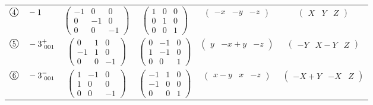 \documentclass[fleqn,10pt,landscape]{jsarticle}
\begin{document}
\begin{center}
\begin{longtable}{lcccc}
$ {\ooalign{\hfil\resizebox{.8\width}{\height}{4}\hfil\crcr\raise.1ex\hbox{\large$\bigcirc$}}}\quad -1 $ & $ \begin{pmatrix} -1 & 0 & 0 \\ 0 & -1 & 0 \\ 0 & 0 & -1 \end{pmatrix} $ & $ \begin{pmatrix} 1 & 0 & 0 \\ 0 & 1 & 0 \\ 0 & 0 & 1 \end{pmatrix} $ & $ \begin{pmatrix} - x & - y & - z \end{pmatrix} $ & $ \begin{pmatrix} X & Y & Z \end{pmatrix} $ \\
$ {\ooalign{\hfil\resizebox{.8\width}{\height}{5}\hfil\crcr\raise.1ex\hbox{\large$\bigcirc$}}}\quad -3^{+}_{\,\,001} $ & $ \begin{pmatrix} 0 & 1 & 0 \\ -1 & 1 & 0 \\ 0 & 0 & -1 \end{pmatrix} $ & $ \begin{pmatrix} 0 & -1 & 0 \\ 1 & -1 & 0 \\ 0 & 0 & 1 \end{pmatrix} $ & $ \begin{pmatrix} y & - x + y & - z \end{pmatrix} $ & $ \begin{pmatrix} - Y & X - Y & Z \end{pmatrix} $ \\
$ {\ooalign{\hfil\resizebox{.8\width}{\height}{6}\hfil\crcr\raise.1ex\hbox{\large$\bigcirc$}}}\quad -3^{-}_{\,\,001} $ & $ \begin{pmatrix} 1 & -1 & 0 \\ 1 & 0 & 0 \\ 0 & 0 & -1 \end{pmatrix} $ & $ \begin{pmatrix} -1 & 1 & 0 \\ -1 & 0 & 0 \\ 0 & 0 & 1 \end{pmatrix} $ & $ \begin{pmatrix} x - y & x & - z \end{pmatrix} $ & $ \begin{pmatrix} - X + Y & - X & Z \end{pmatrix} $ \\
\end{longtable}
\end{center}
\end{document}
